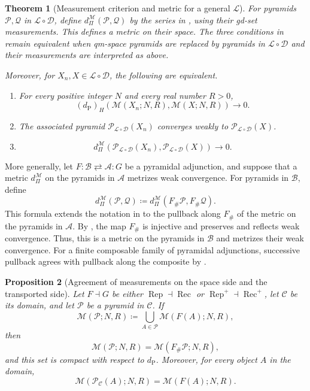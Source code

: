 \documentclass{amsart}
\theoremstyle{plain}
\newtheorem{theorem}{Theorem}[section]
\newtheorem{proposition}[theorem]{Proposition}
\theoremstyle{definition}
\theoremstyle{remark}
\newcommand{\D}{\mathcal{D}}
\newcommand{\M}{\mathcal{M}}
\renewcommand{\L}{\mathcal{L}}
\newcommand{\dpr}{d_{\operatorname{P}}}
\newcommand{\haus}[1]{\left(#1\right)_H}
\begin{document}
\begin{theorem}[Measurement criterion and metric for a general $\L$]
\label{thm:general-l-ordered-measurement-metric}
For pyramids $\mathcal P,\mathcal Q$ in $\L\circ\D$, define $d_{\Pi}^{\M}(\mathcal P,\mathcal Q)$ by the series in , using their gd-set measurements. This defines a metric on their space. The three conditions in  remain equivalent when qm-space pyramids are replaced by pyramids in $\L\circ\D$ and their measurements are interpreted as above.

Moreover, for $X_n,X\in\L\circ\D$, the following are equivalent.
\begin{enumerate}[label=\textup{(\alph*)}]
\item For every positive integer $N$ and every real number $R>0$,
\[\haus{\dpr}(\M(X_n;N,R),\M(X;N,R))\longrightarrow0.\]
\item The associated pyramid $\mathcal P_{\L\circ\D}(X_n)$ converges weakly to $\mathcal P_{\L\circ\D}(X)$.
\item
\[d_{\Pi}^{\M}(\mathcal P_{\L\circ\D}(X_n),\mathcal P_{\L\circ\D}(X))\longrightarrow0.\]
\end{enumerate}
\end{theorem}

More generally, let $F\colon\mathcal B\rightleftarrows\mathcal A\colon G$ be a pyramidal adjunction, and suppose that a metric $d_{\Pi}^{\M}$ on the pyramids in $\mathcal A$ metrizes weak convergence. For pyramids in $\mathcal B$, define
\[
d_{\Pi}^{\M}(\mathcal P,\mathcal Q)
\coloneqq d_{\Pi}^{\M}(F_{\#}\mathcal P,F_{\#}\mathcal Q).
\]
This formula extends the notation in  to the pullback along $F_{\#}$ of the metric on the pyramids in $\mathcal A$. By , the map $F_{\#}$ is injective and preserves and reflects weak convergence. Thus, this is a metric on the pyramids in $\mathcal B$ and metrizes their weak convergence. For a finite composable family of pyramidal adjunctions, successive pullback agrees with pullback along the composite by .

\begin{proposition}[Agreement of measurements on the space side and the transported side]
\label{prop:space-pyramid-measurement-transport}
Let $F\dashv G$ be either $\operatorname{Rep}\dashv\operatorname{Rec}$ or $\operatorname{Rep}^{+}\dashv\operatorname{Rec}^{+}$, let $\mathcal C$ be its domain, and let $\mathcal P$ be a pyramid in $\mathcal C$. If
\[\M(\mathcal P;N,R)\coloneqq\bigcup_{A\in\mathcal P}\M(F(A);N,R),\]
then
\[\M(\mathcal P;N,R)=\M(F_{\#}\mathcal P;N,R),\]
and this set is compact with respect to $\dpr$. Moreover, for every object $A$ in the domain,
\[\M(\mathcal P_{\mathcal C}(A);N,R)=\M(F(A);N,R).\]
\end{proposition}
\end{document}
